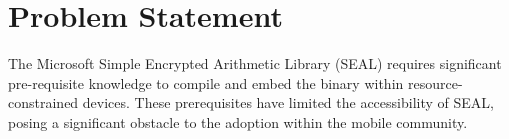 \section{Problem Statement}
\label{sec:Problem Statement}
The Microsoft Simple Encrypted Arithmetic Library (SEAL) \cite{sealcrypto} requires significant pre-requisite knowledge to compile and embed the binary within resource-constrained devices. These prerequisites have limited the accessibility of SEAL, posing a significant obstacle to the adoption within the mobile community.
